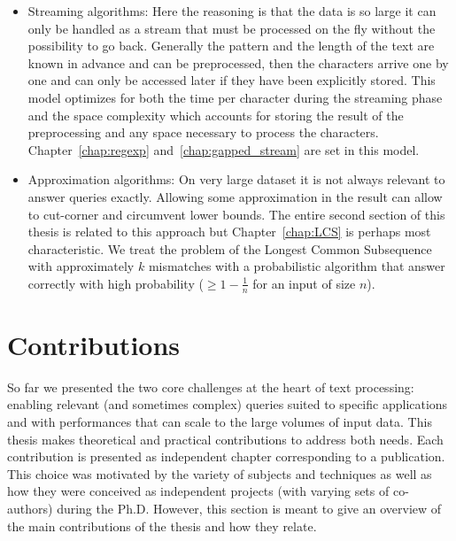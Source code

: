 \begin{itemize}
\item Streaming algorithms: Here the reasoning is that the data is so large it can only be handled as a stream that must be processed on the fly without the possibility to go back. Generally the pattern and the length of the text are known in advance and can be preprocessed, then the characters arrive one by one and can only be accessed later if they have been explicitly stored. This model optimizes for both the time per character during the streaming phase and the space complexity which accounts for storing the result of the preprocessing and any space necessary to process the characters. Chapter~\ref{chap:regexp} and~\ref{chap:gapped_stream} are set in this model.
\item Approximation algorithms: On very large dataset it is not always relevant to answer queries exactly. Allowing some approximation in the result can allow to cut-corner and circumvent lower bounds. The entire second section of this thesis is related to this approach but Chapter~\ref{chap:LCS} is perhaps most characteristic. We treat the problem of the Longest Common Subsequence with approximately $k$ mismatches with a probabilistic algorithm that answer correctly with high probability ($\geq 1 - \frac{1}{n}$ for an input of size $n$).
\end{itemize}

\section{Contributions}\label{intro:sec:contrib}

So far we presented the two core challenges at the heart of text processing: enabling relevant (and sometimes complex) queries suited to specific applications and with performances that can scale to the large volumes of input data.
%
This thesis makes theoretical and practical contributions to address both needs. 
Each contribution is presented as independent chapter corresponding to a publication. This choice was motivated by the variety of subjects and techniques as well as how they were conceived as independent projects (with varying sets of co-authors) during the Ph.D. However, this section is meant to give an overview of the main contributions of the thesis and how they relate.


